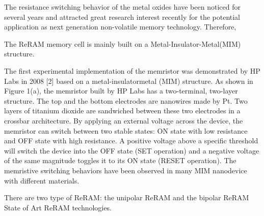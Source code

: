 The resistance switching behavior of the metal oxides have been noticed for several years and attracted great research interest recently for the potential application as next generation non-volatile memory technology.
Therefore,

The ReRAM memory cell is mainly built on a Metal-Insulator-Metal(MIM) structure.

The first experimental implementation of the memristor was
demonstrated by HP Labs in 2008 [2] based on a metal-insulatormetal
(MIM) structure. As shown in Figure 1(a), the memristor built
by HP Labs has a two-terminal, two-layer structure. The top and
the bottom electrodes are nanowires made by Pt. Two layers of
titanium dioxide are sandwiched between these two electrodes in
a crossbar architecture. By applying an external voltage across the
device, the memristor can switch between two stable states: ON
state with low resistance and OFF state with high resistance. A
positive voltage above a specific threshold will switch the device
into the OFF state (SET operation) and a negative voltage of the
same magnitude toggles it to its ON state (RESET operation). The
memristive switching behaviors have been observed in many MIM
nanodevice with different materials.

There are two type of ReRAM: the unipolar ReRAM and the bipolar ReRAM
State of Art ReRAM technologies.


